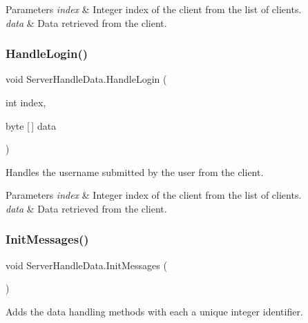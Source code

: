 \begin{DoxyParams}{Parameters}
{\em index} & Integer index of the client from the list of clients.\\
\hline
{\em data} & Data retrieved from the client.\\
\hline
\end{DoxyParams}
\mbox{\label{class_server_handle_data_a4c8dd95c63e24e150f4d80b89c0b8188}} 
\subsubsection{\texorpdfstring{HandleLogin()}{HandleLogin()}}
{\footnotesize\ttfamily void Server\+Handle\+Data.\+Handle\+Login (\begin{DoxyParamCaption}\item[{int}]{index,  }\item[{byte \mbox{[}$\,$\mbox{]}}]{data }\end{DoxyParamCaption})\hspace{0.3cm}{\ttfamily [private]}}



Handles the username submitted by the user from the client. 


\begin{DoxyParams}{Parameters}
{\em index} & Integer index of the client from the list of clients.\\
\hline
{\em data} & Data retrieved from the client.\\
\hline
\end{DoxyParams}
\mbox{\label{class_server_handle_data_a81cc7ca39a0389d206ad6547a729f9f0}} 
\subsubsection{\texorpdfstring{InitMessages()}{InitMessages()}}
{\footnotesize\ttfamily void Server\+Handle\+Data.\+Init\+Messages (\begin{DoxyParamCaption}{ }\end{DoxyParamCaption})}



Adds the data handling methods with each a unique integer identifier. 

